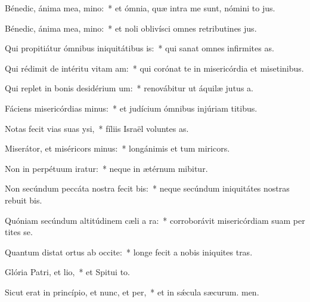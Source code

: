 \item Bénedic, ánima mea, mino:~* et ómnia, quæ intra me sunt, nómini to jus.
\item Bénedic, ánima mea, mino:~* et noli oblivísci omnes retributines jus.
\item Qui propitiátur ómnibus iniquitátibus is:~* qui sanat omnes infirmites as.
\item Qui rédimit de intéritu vitam am:~* qui corónat te in misericórdia et misetinibus.
\item Qui replet in bonis desidérium um:~* renovábitur ut áquilæ jutus a.
\item Fáciens misericórdias minus:~* et judícium ómnibus injúriam titibus.
\item Notas fecit vias suas ysi,~* fíliis Israël voluntes as.
\item Miserátor, et miséricors minus:~* longánimis et tum miricors.
\item Non in perpétuum iratur:~* neque in ætérnum mibitur.
\item Non secúndum peccáta nostra fecit bis:~* neque secúndum iniquitátes nostras rebuit bis.
\item Quóniam secúndum altitúdinem cæli a ra:~* corroborávit misericórdiam suam per tites se.
\item Quantum distat ortus ab occite:~* longe fecit a nobis iniquites tras.
\item Glória Patri, et lio,~* et Spitui to.
\item Sicut erat in princípio, et nunc, et per,~* et in sǽcula sæcurum. men.
